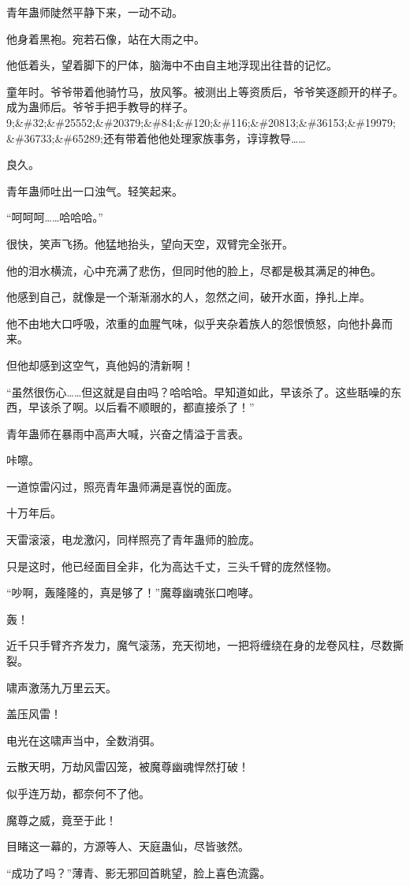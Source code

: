 \begin{this_body}
青年蛊师陡然平静下来，一动不动。

他身着黑袍。宛若石像，站在大雨之中。

他低着头，望着脚下的尸体，脑海中不由自主地浮现出往昔的记忆。

童年时。爷爷带着他骑竹马，放风筝。被测出上等资质后，爷爷笑逐颜开的样子。成为蛊师后。爷爷手把手教导的样子。9;\&\#32;\&\#25552;\&\#20379;\&\#84;\&\#120;\&\#116;\&\#20813;\&\#36153;\&\#19979;\&\#36733;\&\#65289;还有带着他他处理家族事务，谆谆教导……

良久。

青年蛊师吐出一口浊气。轻笑起来。

“呵呵呵……哈哈哈。”

很快，笑声飞扬。他猛地抬头，望向天空，双臂完全张开。

他的泪水横流，心中充满了悲伤，但同时他的脸上，尽都是极其满足的神色。

他感到自己，就像是一个渐渐溺水的人，忽然之间，破开水面，挣扎上岸。

他不由地大口呼吸，浓重的血腥气味，似乎夹杂着族人的怨恨愤怒，向他扑鼻而来。

但他却感到这空气，真他妈的清新啊！

“虽然很伤心……但这就是自由吗？哈哈哈。早知道如此，早该杀了。这些聒噪的东西，早该杀了啊。以后看不顺眼的，都直接杀了！”

青年蛊师在暴雨中高声大喊，兴奋之情溢于言表。

咔嚓。

一道惊雷闪过，照亮青年蛊师满是喜悦的面庞。

十万年后。

天雷滚滚，电龙激闪，同样照亮了青年蛊师的脸庞。

只是这时，他已经面目全非，化为高达千丈，三头千臂的庞然怪物。

“吵啊，轰隆隆的，真是够了！”魔尊幽魂张口咆哮。

轰！

近千只手臂齐齐发力，魔气滚荡，充天彻地，一把将缠绕在身的龙卷风柱，尽数撕裂。

啸声激荡九万里云天。

盖压风雷！

电光在这啸声当中，全数消弭。

云散天明，万劫风雷囚笼，被魔尊幽魂悍然打破！

似乎连万劫，都奈何不了他。

魔尊之威，竟至于此！

目睹这一幕的，方源等人、天庭蛊仙，尽皆骇然。

“成功了吗？”薄青、影无邪回首眺望，脸上喜色流露。


\end{this_body}
